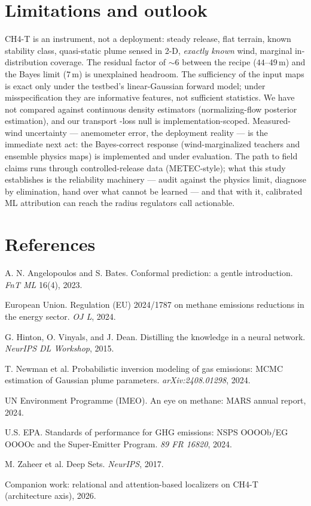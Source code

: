 \documentclass{article}
\begin{document}
\section{Limitations and outlook}

CH4-T is an instrument, not a deployment: steady release, flat terrain, known
stability class, quasi-static plume sensed in 2-D, \emph{exactly known} wind,
marginal in-distribution coverage. The residual factor of $\sim\!6$ between
the recipe ($44$--$49$\,m) and the Bayes limit ($7$\,m) is unexplained
headroom. The sufficiency of the input maps is exact only under the testbed's
linear-Gaussian forward model; under misspecification they are informative
features, not sufficient statistics. We have not compared against continuous
density estimators (normalizing-flow posterior estimation), and our transport
-loss null is implementation-scoped. Measured-wind uncertainty --- anemometer
error, the deployment reality --- is the immediate next act: the Bayes-correct
response (wind-marginalized teachers and ensemble physics maps) is implemented
and under evaluation. The path to field claims runs through controlled-release
data (METEC-style); what this study establishes is the reliability machinery
--- audit against the physics limit, diagnose by elimination, hand over what
cannot be learned --- and that with it, calibrated ML attribution can reach
the radius regulators call actionable.

\section*{References}
{\small
\begin{list}{}{\setlength{\leftmargin}{1.4em}\setlength{\itemindent}{-1.4em}\setlength{\itemsep}{1.5pt}}
\item A. N. Angelopoulos and S. Bates. Conformal prediction: a gentle introduction. \emph{FnT ML} 16(4), 2023.
\item European Union. Regulation (EU) 2024/1787 on methane emissions reductions in the energy sector. \emph{OJ L}, 2024.
\item G. Hinton, O. Vinyals, and J. Dean. Distilling the knowledge in a neural network. \emph{NeurIPS DL Workshop}, 2015.
\item T. Newman et al. Probabilistic inversion modeling of gas emissions: MCMC estimation of Gaussian plume parameters. \emph{arXiv:2408.01298}, 2024.
\item UN Environment Programme (IMEO). An eye on methane: MARS annual report, 2024.
\item U.S. EPA. Standards of performance for GHG emissions: NSPS OOOOb/EG OOOOc and the Super-Emitter Program. \emph{89 FR 16820}, 2024.
\item M. Zaheer et al. Deep Sets. \emph{NeurIPS}, 2017.
\item Companion work: relational and attention-based localizers on CH4-T (architecture axis), 2026.
\end{list}}
\end{document}
